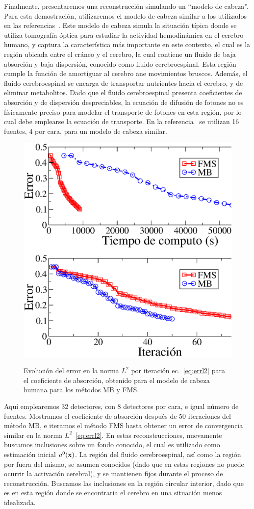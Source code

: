 Finalmente, presentaremos una reconstrucción simulando un ``modelo de cabeza''. 
Para esta demostración, utilizaremos el modelo de cabeza similar 
a los utilizados en las referencias~\cite{Klose2002,Prieto2017}. 
Este modelo de cabeza simula la situación típica donde 
se utiliza tomografía óptica para estudiar la actividad hemodinámica 
en el cerebro humano, y captura la característica más importante 
en este contexto, el cual es la región ubicada entre el cráneo y el cerebro, 
la cual contiene un fluido de baja absorción y baja dispersión, conocido 
como fluido cerebroespinal. Esta región cumple la función de 
amortiguar al cerebro ane movimientos bruscos. Además, el fluido cerebroespinal 
se encarga de transportar nutrientes hacia el cerebro, y de
eliminar metabolitos.
Dado que el fluido cerebroespinal presenta coeficientes de absorción y de dispersión 
despreciables, la ecuación de difusión de fotones no es físicamente preciso para modelar 
el transporte de fotones en esta región, por lo cual debe emplearse la ecuación de transporte.
En la referencia~\cite{Prieto2017} se utilizan 16 fuentes, 4 por cara, para 
un modelo de cabeza similar. 

\begin{figure}[h!]
\centering
  \includegraphics[width=0.5\linewidth]{figuras/l2err.eps}\\
  \caption{Evolución del error en la norma $L^2$ por iteración ec.~\eqref{eq:errl2} para el coeficiente de absorción, obtenido para el modelo de cabeza humana para los métodos MB y FMS.}
 \label{fig:ithead}
\end{figure}

\noindent Aquí emplearemos 32 detectores, con 8 detectores por cara, 
e igual número de fuentes. 
Mostramos el coeficiente de absorción después de 50 iteraciones del método MB, 
e iteramos el método FMS hasta obtener un error de convergencia similar en la norma $L^2$~\eqref{eq:errl2}. En estas reconstrucciones, nuevamente buscamos inclusiones 
sobre un fondo conocido, el cual es utilizado como estimación inicial $a^0(\mathbf{x})$. 
La región del fluido cerebroespinal, así como la región por fuera del mismo, 
se asumen conocidos (dado que en estas regiones no puede ocurrir la activación cerebral), 
y se mantienen fijos durante el proceso de reconstrucción. Buscamos las inclusiones 
en la región circular interior, dado que es en esta región donde se encontraría 
el cerebro en una situación menos idealizada.

